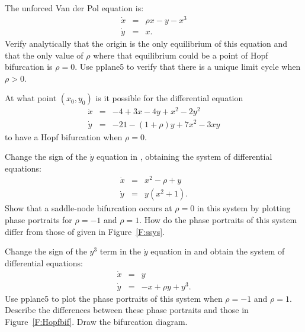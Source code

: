 \documentclass{ximera}
\begin{document}
\begin{exercise} \label{c9.4.1}
The unforced Van der Pol equation is: 
\begin{equation*}
\begin{array}{rcl}
\dot{x} & = & \rho x - y -x^3 \\
\dot{y} & = & x.
\end{array}
\end{equation*}
Verify analytically that the origin is the only equilibrium of this equation
and that the only value of $\rho$ where that equilibrium could be a point of
Hopf bifurcation is $\rho=0$.  Use {\sf pplane5} to verify that there is a 
unique limit cycle when $\rho>0$.
\end{exercise} 


\begin{exercise} \label{c9.4.2}
At what point $(x_0,y_0)$ is it possible for the differential equation 
\begin{equation*}  \label{E:hopfex}
\begin{array}{rcl}
\dot{x} & = & -4 +3x -4y +x^2 -2y^2 \\
\dot{y} & = & -21 -(1+\rho)y + 7x^2 - 3xy
\end{array}
\end{equation*}
to have a Hopf bifurcation when $\rho=0$.  
\end{exercise}



\CEXER

\begin{exercise} \label{e:source}
Change the sign of the $\dot{y}$ equation in , obtaining the 
system of differential equations:  
\[
\begin{array}{rcl}
\dot{x} & = & x^2 - \rho + y \\
\dot{y} & = & y(x^2+1).  \end{array}
\]
Show that a saddle-node bifurcation occurs at $\rho=0$ in this system by 
plotting phase portraits for $\rho=-1$ and $\rho=1$.  How do the 
phase portraits of this system differ from those of  
given in Figure~\ref{F:ssys}.
\end{exercise}

\begin{exercise}  \label{e:uHopf}
Change the sign of the $y^3$ term in the $\dot{y}$ equation in 
 and obtain the system of differential equations:
\[
\begin{array}{rcl}
\dot{x} & = & y \\
\dot{y} & = & -x + \rho y + y^3.  \end{array}
\]
Use {\sf pplane5}
to plot the phase portraits of this system when 
$\rho=-1$ and $\rho=1$.  Describe the differences between these phase portraits
and those in Figure~\ref{F:Hopfbif}. Draw the bifurcation diagram.
\end{exercise}
\end{document}
